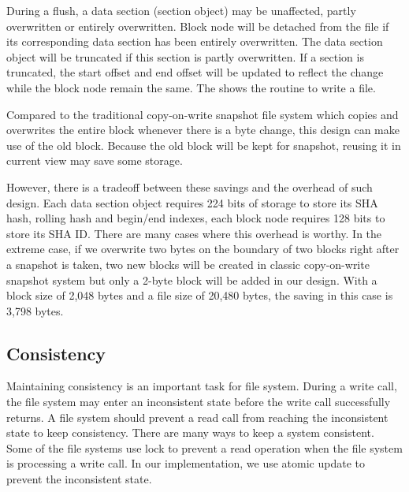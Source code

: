     During a flush, a data section (section object) may be unaffected, partly overwritten or entirely overwritten. Block node will be detached from the file if its corresponding data section has been entirely overwritten. The data section object will be truncated if this section is partly overwritten. If a section is truncated, the start offset and end offset will be updated to reflect the change while the block node remain the same. The  shows the routine to write a file.

    Compared to the traditional copy-on-write snapshot file system which copies and overwrites the entire block whenever there is a byte change, this design can make use of the old block. Because the old block will be kept for snapshot, reusing it in current view may save some storage.

    However, there is a tradeoff between these savings and the overhead of such design. Each data section object requires 224 bits of storage to store its SHA hash, rolling hash and begin/end indexes, each block node requires 128 bits to store its SHA ID. There are many cases where this overhead is worthy. In the extreme case, if we overwrite two bytes on the boundary of two blocks right after a snapshot is taken, two new blocks will be created in classic copy-on-write snapshot system but only a 2-byte block will be added in our design. With a block size of 2,048 bytes and a file size of 20,480 bytes, the saving in this case is 3,798 bytes.

\subsection{Consistency}

    Maintaining consistency is an important task for file system. During a write call, the file system may enter an inconsistent state before the write call successfully returns. A file system should prevent a read call from reaching the inconsistent state to keep consistency. There are many ways to keep a system consistent. Some of the file systems use lock to prevent a read operation when the file system is processing a write call. In our implementation, we use atomic update to prevent the inconsistent state.

